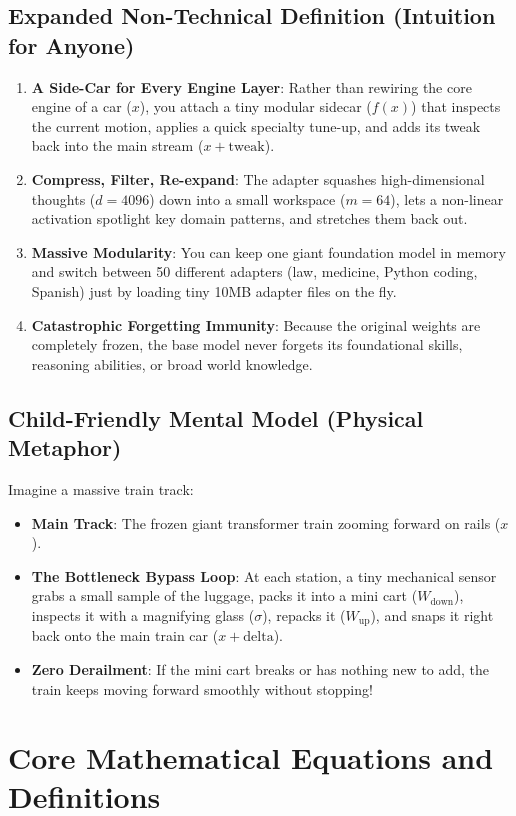 \documentclass[11pt,a4paper]{article}
\theoremstyle{definition}
\begin{document}
\subsection{Expanded Non-Technical Definition (Intuition for Anyone)}
\begin{enumerate}
    \item \textbf{A Side-Car for Every Engine Layer}: Rather than rewiring the core engine of a car ($x$), you attach a tiny modular sidecar ($f(x)$) that inspects the current motion, applies a quick specialty tune-up, and adds its tweak back into the main stream ($x + \text{tweak}$).
    \item \textbf{Compress, Filter, Re-expand}: The adapter squashes high-dimensional thoughts ($d = 4096$) down into a small workspace ($m = 64$), lets a non-linear activation spotlight key domain patterns, and stretches them back out.
    \item \textbf{Massive Modularity}: You can keep one giant foundation model in memory and switch between 50 different adapters (law, medicine, Python coding, Spanish) just by loading tiny 10MB adapter files on the fly.
    \item \textbf{Catastrophic Forgetting Immunity}: Because the original weights are completely frozen, the base model never forgets its foundational skills, reasoning abilities, or broad world knowledge.
\end{enumerate}

\subsection{Child-Friendly Mental Model (Physical Metaphor)}
Imagine a massive train track:
\begin{itemize}
    \item \textbf{Main Track}: The frozen giant transformer train zooming forward on rails ($x$).
    \item \textbf{The Bottleneck Bypass Loop}: At each station, a tiny mechanical sensor grabs a small sample of the luggage, packs it into a mini cart ($W_{\text{down}}$), inspects it with a magnifying glass ($\sigma$), repacks it ($W_{\text{up}}$), and snaps it right back onto the main train car ($x + \text{delta}$).
    \item \textbf{Zero Derailment}: If the mini cart breaks or has nothing new to add, the train keeps moving forward smoothly without stopping!
\end{itemize}

\section{Core Mathematical Equations and Definitions}
\end{document}

